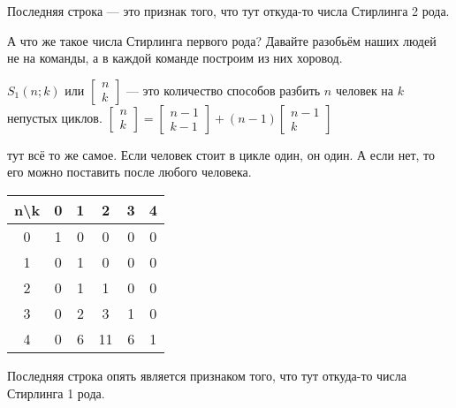 \documentclass{article}
\begin{document}
\begin{itemize}
\begin{Comment}
\begin{center}
            \end{center}
            Последняя строка --- это признак того, что тут откуда-то числа Стирлинга 2 рода.
        \end{Comment}
        \begin{Comment}
            А что же такое числа Стирлинга первого рода? Давайте разобьём наших людей не на команды, а в каждой команде построим из них хоровод.
        \end{Comment}
        \dfn {} $S_1(n;k)$ или $\left[\begin{matrix}n\\k\end{matrix}\right]$ --- это количество способов разбить $n$ человек на $k$ непустых циклов.
        \thm $\left[\begin{matrix}n\\k\end{matrix}\right]=\left[\begin{matrix}n-1\\k-1\end{matrix}\right]+(n-1)\left[\begin{matrix}n-1\\k\end{matrix}\right]$
        \begin{Proof}
            тут всё то же самое. Если человек стоит в цикле один, он один. А если нет, то его можно поставить после любого человека.
        \end{Proof}
        \begin{Comment}
            \begin{center}
                \begin{tabular}{|c|ccccc|}
                    \hline
                    n\textbackslash k & 0 & 1 & 2 & 3 & 4\\
                    \hline
                    0 & 1 & 0 & 0 & 0 & 0\\
                    1 & 0 & 1 & 0 & 0 & 0\\
                    2 & 0 & 1 & 1 & 0 & 0\\
                    3 & 0 & 2 & 3 & 1 & 0\\
                    4 & 0 & 6 & 11 & 6 & 1\\
                    \hline
                \end{tabular}
            \end{center}
            Последняя строка опять является признаком того, что тут откуда-то числа Стирлинга 1 рода.

\end{Comment}
\end{itemize}
\end{document}
